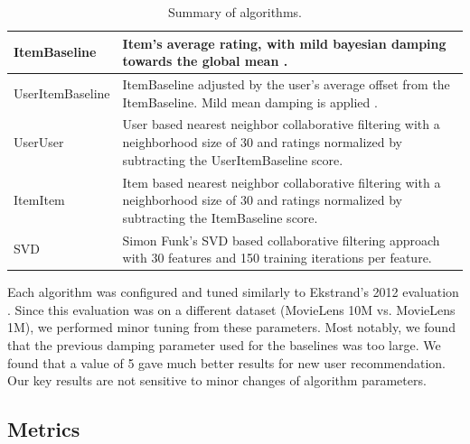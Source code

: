 \documentclass[letterpaper]{sig-alternate}
\begin{document}
  \begin{table}[ht!]
    \centering
    \begin{tabular}{|p{6em}|p{18em}|}
      \hline
      ItemBaseline       & Item's average rating, with mild bayesian damping towards the global mean \cite{funk_netflix_2006}. \\\hline
      UserItem\-Baseline & ItemBaseline adjusted by the user's average offset from the ItemBaseline. Mild mean damping is applied \cite{funk_netflix_2006}. \\\hline
      UserUser           & User based nearest neighbor collaborative filtering \cite{resnick1994grouplens} with a neighborhood size of 30 and ratings normalized by subtracting the UserItemBaseline score. \\\hline
      ItemItem           & Item based nearest neighbor collaborative filtering \cite{sarwar2001item} with a neighborhood size of 30 and ratings normalized by subtracting the ItemBaseline score.   \\\hline
      SVD                & Simon Funk's SVD based collaborative filtering approach \cite{funk_netflix_2006} with 30 features and 150 training iterations per feature. \\\hline
    \end{tabular}
    \caption{Summary of algorithms.}
    \label{tbl:algo}
  \end{table}
  
  Each algorithm was configured and tuned similarly to Ekstrand's 2012 evaluation \cite{ekstrand2012recommenders}.
  Since this evaluation was on a different dataset (MovieLens 10M vs. MovieLens 1M), we performed minor tuning from these parameters.
  Most notably, we found that the previous damping parameter used for the baselines was too large.
  We found that a value of 5 gave much better results for new user recommendation.
  Our key results are not sensitive to minor changes of algorithm parameters.


  \subsection*{Metrics}
\end{document}
